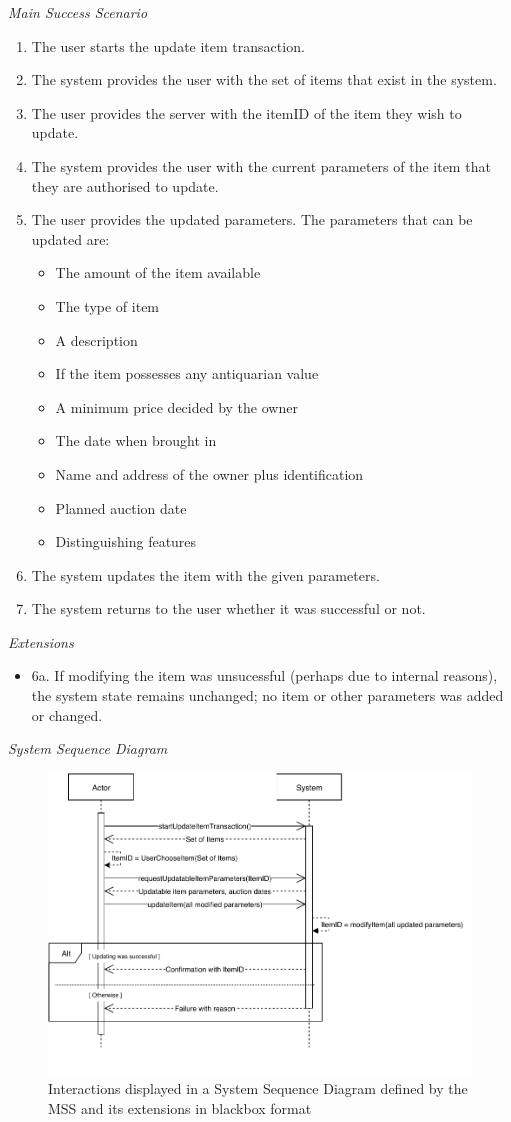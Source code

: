 \textsl{Main Success Scenario}
\begin{enumerate}[noitemsep]
	\item The user starts the update item transaction.
	\item The system provides the user with the set of items that exist in the system.
	\item The user provides the server with the itemID of the item they wish to update. 
	\item The system provides the user with the current parameters of the item that they are authorised to update.
	\item The user provides the updated parameters. The parameters that can be updated are:
	\begin{itemize}[noitemsep]
		\item The amount of the item available
		\item The type of item
		\item A description
		\item If the item possesses any antiquarian value
		\item A minimum price decided by the owner
		\item The date when brought in
		\item Name and address of the owner plus identification
		\item Planned auction date
		\item Distinguishing features
	\end{itemize}
	\item The system updates the item with the given parameters.
	\item The system returns to the user whether it was successful or not. 
\end{enumerate}
\textsl{Extensions}
\begin{itemize}[noitemsep]
	\item 6a. If modifying the item was unsucessful (perhaps due to internal reasons), the system state remains unchanged; no item or other parameters was added or changed.
\end{itemize}
\textsl{System Sequence Diagram}
\begin{figure}[H]
	\centering
	\includegraphics[scale=1]{uml/SD-bb-update.pdf}
	\caption*{Interactions displayed in a System Sequence Diagram defined by the MSS and its extensions in blackbox format}
\end{figure}